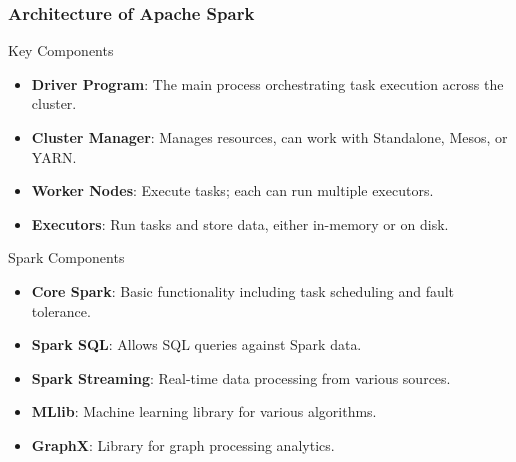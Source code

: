 \documentclass{beamer}
\begin{document}
\begin{frame}[fragile]
    \frametitle{Architecture of Apache Spark}
    
    \begin{block}{Key Components}
        \begin{itemize}
            \item \textbf{Driver Program}: The main process orchestrating task execution across the cluster.
            \item \textbf{Cluster Manager}: Manages resources, can work with Standalone, Mesos, or YARN.
            \item \textbf{Worker Nodes}: Execute tasks; each can run multiple executors.
            \item \textbf{Executors}: Run tasks and store data, either in-memory or on disk.
        \end{itemize}
    \end{block}

    \begin{block}{Spark Components}
        \begin{itemize}
            \item \textbf{Core Spark}: Basic functionality including task scheduling and fault tolerance.
            \item \textbf{Spark SQL}: Allows SQL queries against Spark data.
            \item \textbf{Spark Streaming}: Real-time data processing from various sources.
            \item \textbf{MLlib}: Machine learning library for various algorithms.
            \item \textbf{GraphX}: Library for graph processing analytics.
        \end{itemize}
    \end{block}
\end{frame}
\end{document}
